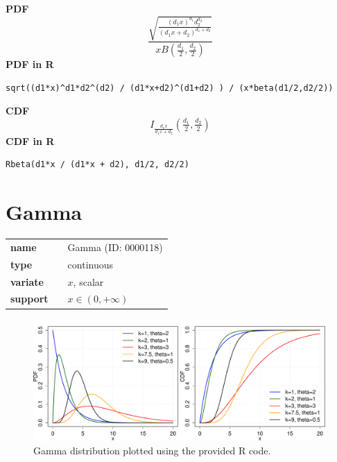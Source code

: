 \documentclass{article}
\begin{document}
\smallskip \noindent \hspace{.2cm} \textbf{PDF} 
\begin{equation*}\frac{\sqrt{\frac{(d_1 x)^{d_1}d_2^{d_2}}
{(d_1 x+d_2)^{d_1+d_2}}}}
{x B\left(\frac{d_1}{2},\frac{d_2}{2}\right)}\end{equation*}
\smallskip \noindent \hspace{.2cm} \textbf{PDF in R}  
\begin{verbatim}sqrt((d1*x)^d1*d2^(d2) / (d1*x+d2)^(d1+d2) ) / (x*beta(d1/2,d2/2))\end{verbatim}
\smallskip \noindent \hspace{.2cm} \textbf{CDF} 
\begin{equation*}I_{\frac{d_1 x}{d_1 x + d_2}} \left(\tfrac{d_1}{2}, \tfrac{d_2}{2} \right)\end{equation*}
\smallskip \noindent \hspace{.2cm} \textbf{CDF in R} 
\begin{verbatim}Rbeta(d1*x / (d1*x + d2), d1/2, d2/2)\end{verbatim}
\smallskip\section*{Gamma} 

  \bigskip 

\begin{tabular}{p{2cm}cl}
\textbf{name} & & Gamma (ID: 0000118)\\ 
 
\textbf{type} & & continuous \\ 

\textbf{variate} & & $x$, scalar \\ 

\textbf{support} & & $x \in (0,+\infty)$
\end{tabular}

\begin{figure}[ht!]
\centering
  \includegraphics[width=140mm]{pics/Gamma.pdf}
 \caption{Gamma distribution plotted using the provided R code.}
 \label{fig:Gamma}
\end{figure}
\end{document}
